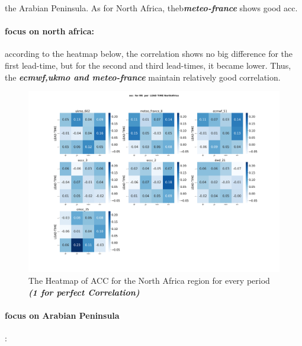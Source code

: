 the Arabian Peninsula. As for North Africa, theb\textbf{\textit{meteo-france}} shows good acc.
\vspace{1.5cm}

\paragraph{focus on north africa:}
according to the heatmap below, the correlation shows no big difference for the first lead-time, but for the second and third lead-times, it became lower. Thus, the \textbf{\textit{ecmwf,ukmo and meteo-france}} maintain relatively good correlation.


\begin{figure}[H]
	\centering
	\includegraphics[scale=0.25]{plots/det/acc/acc_RR_NorthAfrica.png}
	\caption{The Heatmap of ACC for the North Africa region for every period \textbf{\textit{(1 for perfect Correlation)} }}
\end{figure}

\vspace{1.5cm}
\paragraph{focus on Arabian Peninsula}:


